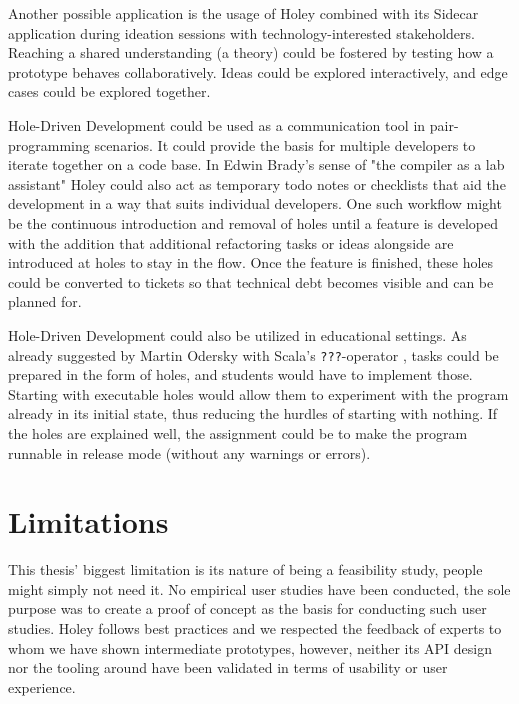 Another possible application is the usage of Holey combined with its Sidecar application during ideation sessions with technology-interested stakeholders.
Reaching a shared understanding (a theory) could be fostered by testing how a prototype behaves collaboratively.
Ideas could be explored interactively, and edge cases could be explored together.

Hole-Driven Development could be used as a communication tool in pair-programming scenarios.
It could provide the basis for multiple developers to iterate together on a code base.
In Edwin Brady's sense of "the compiler as a lab assistant" \cite{brady_type-driven_2017} Holey could also act as temporary todo notes or checklists that aid the development in a way that suits individual developers.
One such workflow might be the continuous introduction and removal of holes until a feature is developed with the addition that additional refactoring tasks or ideas alongside are introduced at holes to stay in the flow.
Once the feature is finished, these holes could be converted to tickets so that technical debt becomes visible and can be planned for.

Hole-Driven Development could also be utilized in educational settings.
As already suggested by Martin Odersky with Scala's \verb|???|-operator \cite{odersky_adding_2011}, tasks could be prepared in the form of holes, and students would have to implement those.
Starting with executable holes would allow them to experiment with the program already in its initial state, thus reducing the hurdles of starting with nothing.
If the holes are explained well, the assignment could be to make the program runnable in release mode (without any warnings or errors).



\section{Limitations}
\label{sec:discussion-limitations}
This thesis' biggest limitation is its nature of being a feasibility study, people might simply not need it.
No empirical user studies have been conducted, the sole purpose was to create a proof of concept as the basis for conducting such user studies.
Holey follows best practices and we respected the feedback of experts to whom we have shown intermediate prototypes, however, neither its API design nor the tooling around have been validated in terms of usability or user experience.

